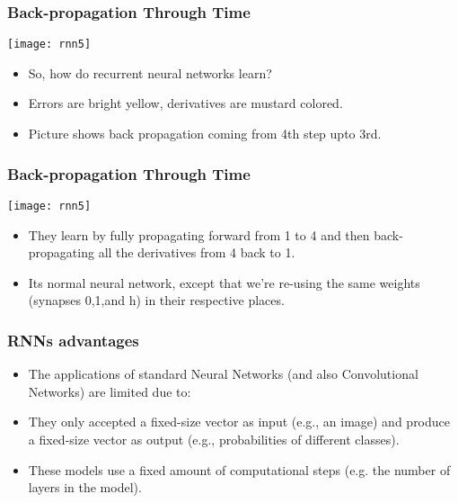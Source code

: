 \begin{frame}[fragile] \frametitle{Back-propagation Through Time}
\begin{center}
\texttt{[image: rnn5]}
\end{center}
\begin{itemize}
\item So, how do recurrent neural networks learn? 
\item Errors are bright yellow, derivatives are mustard colored.
\item Picture shows back propagation coming from 4th step upto 3rd.
\end{itemize}
\end{frame}

\begin{frame}[fragile] \frametitle{Back-propagation Through Time}
\begin{center}
\texttt{[image: rnn5]}
\end{center}
\begin{itemize}
\item They learn by fully propagating forward from 1 to 4 and then back-propagating all the derivatives from 4 back to 1. 
\item Its normal neural network, except that we're re-using the same weights (synapses 0,1,and h) in their respective places. 
\end{itemize}
\end{frame}





\begin{frame}[fragile] \frametitle{RNNs advantages}

\begin{itemize}
\item The applications of standard Neural Networks (and also Convolutional Networks) are limited due to:
\item They only accepted a fixed-size vector as input (e.g., an image) and produce a fixed-size vector as output (e.g., probabilities of different classes). 
\item These models use a fixed amount of computational steps (e.g. the number of layers in the model).
\end{itemize}
\end{frame}

